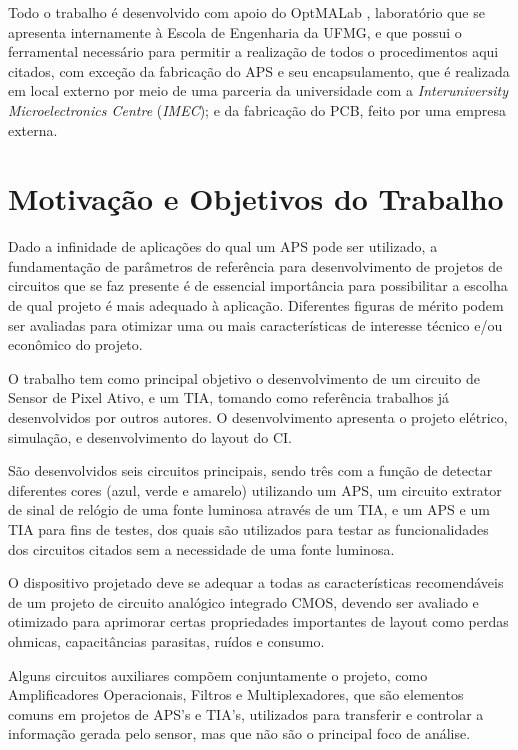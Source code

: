 Todo o trabalho é desenvolvido com apoio do OptMALab , laboratório que se apresenta internamente à Escola de Engenharia da UFMG, e que possui o ferramental necessário para permitir a realização de todos o procedimentos aqui citados, com exceção da fabricação do APS e seu encapsulamento, que é realizada em local externo por meio de uma parceria da universidade com a \emph{Interuniversity Microelectronics Centre} (\emph{IMEC}); e da fabricação do PCB, feito por uma empresa externa.

\section{Motivação e Objetivos do Trabalho}

Dado a infinidade de aplicações do qual um APS pode ser utilizado, a fundamentação de parâmetros de referência para desenvolvimento de projetos de circuitos que se faz presente é de essencial importância para possibilitar a escolha de qual projeto é mais adequado à aplicação. Diferentes figuras de mérito podem ser avaliadas para otimizar uma ou mais características de interesse técnico e/ou econômico do projeto.

O trabalho tem como principal objetivo o desenvolvimento de um circuito de Sensor de Pixel Ativo, e um TIA, tomando como referência trabalhos j\'a desenvolvidos por outros autores. O desenvolvimento apresenta o projeto elétrico, simulação, e desenvolvimento do layout do CI. 

São desenvolvidos seis circuitos principais, sendo três com a função de detectar diferentes cores (azul, verde e amarelo) utilizando um APS, um circuito extrator de sinal de relógio de uma fonte luminosa atrav\'es de um TIA, e um APS e um TIA para fins de testes, dos quais s\~ao utilizados para testar as funcionalidades dos circuitos citados sem a necessidade de uma fonte luminosa. 

O dispositivo projetado deve se adequar a todas as características recomendáveis de um projeto de circuito analógico integrado CMOS, devendo ser avaliado e otimizado para aprimorar certas propriedades importantes de layout como perdas ohmicas, capacitâncias parasitas, ruídos e consumo.

Alguns circuitos auxiliares compõem conjuntamente o projeto, como Amplificadores Operacionais, Filtros e Multiplexadores, que são elementos comuns em projetos de APS’s e TIA's, utilizados para transferir e controlar a informação gerada pelo sensor, mas que não são o principal foco de análise.

